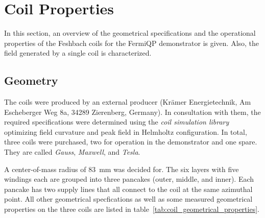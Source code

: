 \section{Coil Properties}\label{ch:coil_properties}
In this section, an overview of the geometrical specifications and the operational properties of the Feshbach coils for the FermiQP demonstrator is given. Also, the field generated by a single coil is characterized.


\subsection*{Geometry}
The coils were produced by an external producer (Krämer Energietechnik, Am Escheberger Weg 8a, 34289 Zierenberg, Germany). In consultation with them, the required specifications were determined using the \textit{coil simulation library} optimizing field curvature and peak field in Helmholtz configuration. In total, three coils were purchased, two for operation in the demonstrator and one spare. They are called \textit{Gauss}, \textit{Maxwell}, and \textit{Tesla}.

A center-of-mass radius of \SI{83}{\milli\meter} was decided for. The six layers with five windings each are grouped into three pancakes (outer, middle, and inner). Each pancake has two supply lines that all connect to the coil at the same azimuthal point. All other geometrical specfications as well as some measured geometrical properties on the three coils are listed in table~\ref{tab:coil_geometrical_properties}.

